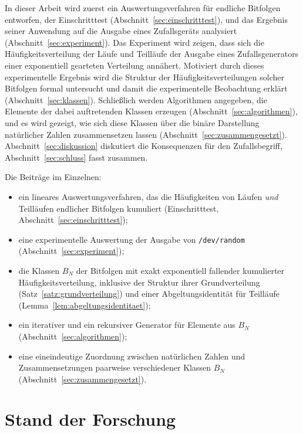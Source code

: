 \documentclass[11pt,a4paper]{scrartcl}
\theoremstyle{plain}
\theoremstyle{definition}
\theoremstyle{remark}
\begin{document}
In dieser Arbeit wird zuerst ein Auswertungsverfahren für endliche Bitfolgen
entworfen, der Einschritttest (Abschnitt~\ref{sec:einschritttest}), und das
Ergebnis seiner Anwendung auf die Ausgabe eines Zufallsgeräts analysiert
(Abschnitt~\ref{sec:experiment}). Das Experiment wird zeigen, dass sich die Häufigkeitsverteilung der
Läufe und Teilläufe der Ausgabe eines Zufallsgenerators einer
exponentiell gearteten Verteilung annähert.
Motiviert durch dieses experimentelle Ergebnis wird die Struktur der
Häufigkeitsverteilungen solcher Bitfolgen formal untersucht und damit die
experimentelle Beobachtung erklärt (Abschnitt~\ref{sec:klassen}). Schließlich
werden Algorithmen angegeben, die Elemente der dabei auftretenden Klassen
erzeugen (Abschnitt~\ref{sec:algorithmen}), und es wird gezeigt, wie sich
diese Klassen über die binäre Darstellung natürlicher Zahlen zusammensetzen
lassen (Abschnitt~\ref{sec:zusammengesetzt}). Abschnitt~\ref{sec:diskussion}
diskutiert die Konsequenzen für den Zufallsbegriff,
Abschnitt~\ref{sec:schluss} fasst zusammen.

Die Beiträge im Einzelnen:
\begin{itemize}
  \item ein lineares Auswertungsverfahren, das die Häufigkeiten von Läufen
        \emph{und} Teilläufen endlicher Bitfolgen kumuliert
        (Einschritttest, Abschnitt~\ref{sec:einschritttest});
  \item eine experimentelle Auswertung der Ausgabe von \texttt{/dev/random}
        (Abschnitt~\ref{sec:experiment});
  \item die Klassen $B_N$ der Bitfolgen mit exakt exponentiell fallender
        kumulierter Häufigkeitsverteilung, inklusive der Struktur ihrer
        Grundverteilung (Satz~\ref{satz:grundverteilung}) und einer
        Abgeltungsidentität für Teilläufe
        (Lemma~\ref{lem:abgeltungsidentitaet});
  \item ein iterativer und ein rekursiver Generator für Elemente aus $B_N$
        (Abschnitt~\ref{sec:algorithmen});
  \item eine eineindeutige Zuordnung zwischen natürlichen Zahlen und
        Zusammensetzungen paarweise verschiedener Klassen $B_N$
        (Abschnitt~\ref{sec:zusammengesetzt}).
\end{itemize}

\section{Stand der Forschung}\label{sec:stand}
\end{document}
